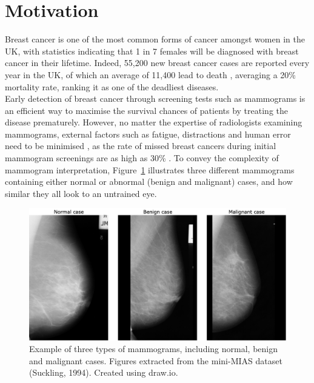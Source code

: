 \section{Motivation}

Breast cancer is one of the most common forms of cancer amongst women in the UK, with statistics indicating that 1 in 7 females will be diagnosed with breast cancer in their lifetime. Indeed, 55,200 new breast cancer cases are reported every year in the UK, of which an average of 11,400 lead to death \citep{BreastCancerResearchUK}, averaging a 20\% mortality rate, ranking it as one of the deadliest diseases.\\

Early detection of breast cancer through screening tests such as mammograms is an efficient way to maximise the survival chances of patients by treating the disease prematurely. However, no matter the expertise of radiologists examining mammograms, external factors such as fatigue, distractions and human error need to be minimised \citep{Polat2007}, as the rate of missed breast cancers during initial mammogram screenings  are as high as 30\% \citep{Elter2009}. To convey the complexity of mammogram interpretation, Figure~\ref{fig:introduction-mammogram-examples} illustrates three different mammograms containing either normal or abnormal (benign and malignant) cases, and how similar they all look to an untrained eye.\\

\begin{figure}[ht]
\centerline{\includegraphics[width=\textwidth]{figures/introduction/mammogram examples.png}}
\caption{\label{fig:introduction-mammogram-examples}Example of three types of mammograms, including normal, benign and malignant cases. Figures extracted from the mini-MIAS dataset (Suckling, 1994). Created using draw.io.}
\end{figure}

